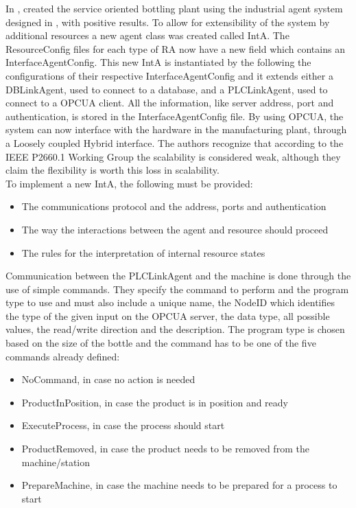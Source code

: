 In \cite{bottling_plant_part2}, \citeauthor{bottling_plant_part2} created the service oriented bottling plant using the industrial agent system designed in \cite{bottling_plant_part1}, with positive results. To allow for extensibility of the system by additional resources a new agent class was created called \acrfull{IntA}. The ResourceConfig files for each type of \acrshort{RA} now have a new field which contains an InterfaceAgentConfig. This new \acrshort{IntA} is instantiated by the  following the configurations of their respective InterfaceAgentConfig and it extends either a DBLinkAgent, used to connect to a database, and a PLCLinkAgent, used to connect to a \acrshort{OPCUA} client. All the information, like server address, port and authentication, is stored in the InterfaceAgentConfig file. By using \acrshort{OPCUA}, the system can now interface with the hardware in the manufacturing plant, through a Loosely coupled Hybrid interface. The authors recognize that according to the IEEE P2660.1 Working Group the scalability is considered weak, although they claim the flexibility is worth this loss in scalability.\\

To implement a new \acrshort{IntA}, the following must be provided:
\begin{itemize}
	\item The communications protocol and the address, ports and authentication
	\item The way the interactions between the agent and resource should proceed
	\item The rules for the interpretation of internal resource states
\end{itemize}

Communication between the PLCLinkAgent and the machine is done through the use of simple commands. They specify the command to perform and the program type to use and must also include a unique name, the NodeID which identifies the type of the given input on the \acrshort{OPCUA} server, the data type, all possible values, the read/write direction and the description. The program type is chosen based on the size of the bottle and the command has to be one of the five commands already defined:

\begin{itemize}
	\item NoCommand, in case no action is needed
	\item ProductInPosition, in case the product is in position and ready
	\item ExecuteProcess, in case the process should start
	\item ProductRemoved, in case the product needs to be removed from the machine/station
	\item PrepareMachine, in case the machine needs to be prepared for a process to start
\end{itemize}


